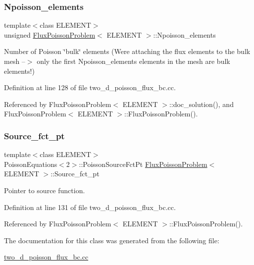 \subsubsection{\texorpdfstring{Npoisson\+\_\+elements}{Npoisson\_elements}}
{\footnotesize\ttfamily template$<$class E\+L\+E\+M\+E\+NT$>$ \\
unsigned \hyperlink{classFluxPoissonProblem}{Flux\+Poisson\+Problem}$<$ E\+L\+E\+M\+E\+NT $>$\+::Npoisson\+\_\+elements\hspace{0.3cm}{\ttfamily [private]}}



Number of Poisson \char`\"{}bulk\char`\"{} elements (We\textquotesingle{}re attaching the flux elements to the bulk mesh --$>$ only the first Npoisson\+\_\+elements elements in the mesh are bulk elements!) 



Definition at line 128 of file two\+\_\+d\+\_\+poisson\+\_\+flux\+\_\+bc.\+cc.



Referenced by Flux\+Poisson\+Problem$<$ E\+L\+E\+M\+E\+N\+T $>$\+::doc\+\_\+solution(), and Flux\+Poisson\+Problem$<$ E\+L\+E\+M\+E\+N\+T $>$\+::\+Flux\+Poisson\+Problem().

\mbox{\label{classFluxPoissonProblem_ad003b34801b1c58b762bec0fe00b86aa}} 
\subsubsection{\texorpdfstring{Source\+\_\+fct\+\_\+pt}{Source\_fct\_pt}}
{\footnotesize\ttfamily template$<$class E\+L\+E\+M\+E\+NT$>$ \\
Poisson\+Equations$<$2$>$\+::Poisson\+Source\+Fct\+Pt \hyperlink{classFluxPoissonProblem}{Flux\+Poisson\+Problem}$<$ E\+L\+E\+M\+E\+NT $>$\+::Source\+\_\+fct\+\_\+pt\hspace{0.3cm}{\ttfamily [private]}}



Pointer to source function. 



Definition at line 131 of file two\+\_\+d\+\_\+poisson\+\_\+flux\+\_\+bc.\+cc.



Referenced by Flux\+Poisson\+Problem$<$ E\+L\+E\+M\+E\+N\+T $>$\+::\+Flux\+Poisson\+Problem().



The documentation for this class was generated from the following file\+:\begin{DoxyCompactItemize}
\item 
\hyperlink{two__d__poisson__flux__bc_8cc}{two\+\_\+d\+\_\+poisson\+\_\+flux\+\_\+bc.\+cc}\end{DoxyCompactItemize}
